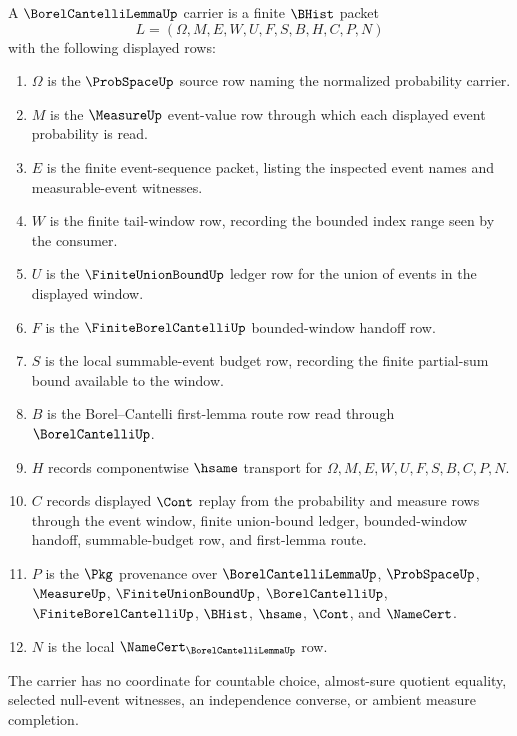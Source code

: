 \begin{definition}
\label{def:borel-cantelli-lemma-carrier}
A $\BorelCantelliLemmaUp$ carrier is a finite $\BHist$ packet
$$
L=(\Omega,M,E,W,U,F,S,B,H,C,P,N)
$$
with the following displayed rows:
\begin{enumerate}
\item $\Omega$ is the $\ProbSpaceUp$ source row naming the normalized probability carrier.
\item $M$ is the $\MeasureUp$ event-value row through which each displayed event probability is read.
\item $E$ is the finite event-sequence packet, listing the inspected event names and measurable-event witnesses.
\item $W$ is the finite tail-window row, recording the bounded index range seen by the consumer.
\item $U$ is the $\FiniteUnionBoundUp$ ledger row for the union of events in the displayed window.
\item $F$ is the $\FiniteBorelCantelliUp$ bounded-window handoff row.
\item $S$ is the local summable-event budget row, recording the finite partial-sum bound available to the window.
\item $B$ is the Borel--Cantelli first-lemma route row read through $\BorelCantelliUp$.
\item $H$ records componentwise $\hsame$ transport for $\Omega,M,E,W,U,F,S,B,C,P,N$.
\item $C$ records displayed $\Cont$ replay from the probability and measure rows through the event window, finite union-bound ledger, bounded-window handoff, summable-budget row, and first-lemma route.
\item $P$ is the $\Pkg$ provenance over $\BorelCantelliLemmaUp$, $\ProbSpaceUp$, $\MeasureUp$, $\FiniteUnionBoundUp$, $\BorelCantelliUp$, $\FiniteBorelCantelliUp$, $\BHist$, $\hsame$, $\Cont$, and $\NameCert$.
\item $N$ is the local $\NameCert_{\BorelCantelliLemmaUp}$ row.
\end{enumerate}
The carrier has no coordinate for countable choice, almost-sure quotient equality, selected null-event witnesses, an independence converse, or ambient measure completion.
\end{definition}


